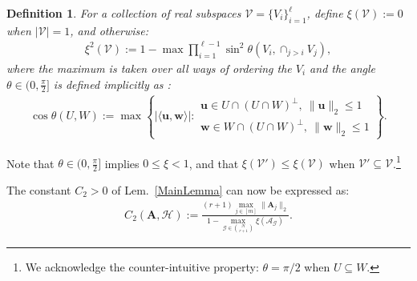\documentclass[journal, twocolumn]{IEEEtran}
\newtheorem{definition}{Definition}
\begin{document}
\begin{definition}\label{FriedrichsDefinition}
For a collection of real subspaces $\mathcal{V} = \{V_i\}_{i=1}^\ell$, define $\xi(\mathcal{V}) := 0$ when $|\mathcal{V}| = 1$, and otherwise:
\begin{align}\label{xi}
\xi^2(\mathcal{V}) := 1 -  \max \prod_{i=1}^{\ell-1} \sin^2  \theta \left(V_i, \cap_{j>i} V_j \right) ,
\end{align} 
%
where the maximum is taken over all ways of ordering 
the $V_i$ and the angle $\theta \in (0,\frac{\pi}{2}]$ is defined implicitly as \cite[Def.~9.4]{Deutsch12}:
\begin{align*}
\cos{\theta(U,W)} := \max\left\{ |\langle \mathbf{u}, \mathbf{w} \rangle|: \substack{ \mathbf{u} \in U \cap (U \cap W)^\perp, \ \|\mathbf{u}\|_2 \leq 1 \\ \mathbf{w} \in W \cap (U \cap W)^\perp, \  \|\mathbf{w}\|_2 \leq 1 } \right\}.
\end{align*}
\end{definition}
Note that $\theta \in (0,\frac{\pi}{2}]$ implies $0 \leq \xi < 1$, and that $\xi(\mathcal{V}') \leq \xi(\mathcal{V})$ when $\mathcal{V}' \subseteq \mathcal{V}$.\footnote{We acknowledge the counter-intuitive property: $\theta =  \pi/2$ when $U \subseteq W$.}  

The constant $C_2 > 0$ of Lem.~\ref{MainLemma} can now be expressed as:  
\begin{align}\label{Cdef2}
	C_2(\mathbf{A}, \mathcal{H}) := \frac{ (r+1) \max_{j \in [m]} \|\mathbf{A}_j\|_2}{ 1- \max_{\mathcal{G} \in {\mathcal{H} \choose r+1}} \xi( \bm{\mathcal{A}}_\mathcal{G} ) }.
\end{align}
\end{document}
